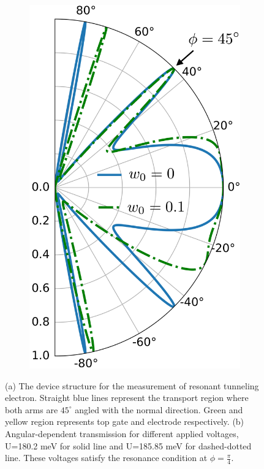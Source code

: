 \begin{figure}[H]
\begin{subfigure}[b]{0.3\linewidth}
            \includegraphics[width=\linewidth]{fig/tp Ef = 0.08 U1 = 0.1802 e1 = 0 e3 = 0.1.png}
            \caption{}
            \label{fig:tp at 45 deg}
        \end{subfigure}
        \caption{(a) The device structure for the measurement of resonant tunneling electron.  
                    Straight blue lines represent the transport region where both arms are $45^{\circ}$ angled with the normal direction. 
                    Green and yellow region represents top gate and electrode respectively. 
                    (b) Angular-dependent transmission for different applied voltages, U=180.2 meV for solid line and U=185.85 meV for dashed-dotted line. 
                    These voltages satisfy the resonance condition at $\phi = \frac{\pi}{4}$.}
        \label{fig:find w}
    \end{figure}
